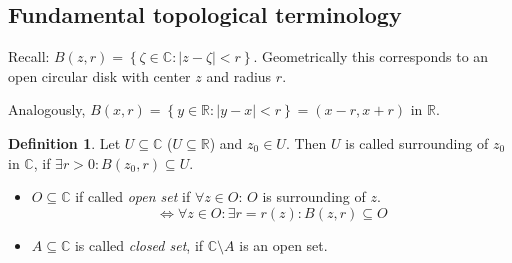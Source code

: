 \documentclass[a4paper,landscape,twocolumn]{article}
\theoremstyle{definition}
\newtheorem{defi}{Definition}
\newcommand\set[1]{\left\{#1\right\}}
\newcommand\abs[1]{\left|#1\right|}
\begin{document}
\subsection{Fundamental topological terminology}
%
Recall: $B(z, r) = \set{\zeta \in \mathbb C: \abs{z - \zeta} < r}$.
Geometrically this corresponds to an open circular disk with center $z$ and radius $r$.

Analogously, $B(x, r) = \set{y \in \mathbb R: \abs{y - x} < r} = (x-r, x+r)$
in $\mathbb R$.

\begin{defi}
  Let $U \subseteq \mathbb C$ ($U \subseteq \mathbb R$) and $z_0 \in U$.
  Then $U$ is called surrounding of $z_0$ in $\mathbb C$,
  if $\exists r > 0: B(z_0, r) \subseteq U$.
  \begin{itemize}
    \item
      $O \subseteq \mathbb C$ if called \emph{open set} if $\forall z \in O$:
      $O$ is surrounding of $z$.
      \[ \iff \forall z \in O: \exists r = r(z): B(z, r) \subseteq O \]
    \item
      $A \subseteq \mathbb C$ is called \emph{closed set}, if $\mathbb C \setminus A$
      is an open set.
  \end{itemize}
\end{defi}
\end{document}
